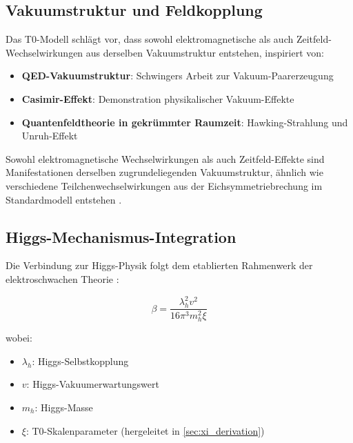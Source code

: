 \documentclass[12pt,a4paper]{article}
\begin{document}
	\subsection{Vakuumstruktur und Feldkopplung}
	\label{subsec:vacuum_structure}
	
	Das T0-Modell schlägt vor, dass sowohl elektromagnetische als auch Zeitfeld-Wechselwirkungen aus derselben Vakuumstruktur entstehen, inspiriert von:
	\begin{itemize}
		\item \textbf{QED-Vakuumstruktur}: Schwingers Arbeit zur Vakuum-Paarerzeugung \citep{schwinger1951}
		\item \textbf{Casimir-Effekt}: Demonstration physikalischer Vakuum-Effekte \citep{casimir1948}
		\item \textbf{Quantenfeldtheorie in gekrümmter Raumzeit}: Hawking-Strahlung \citep{hawking1975} und Unruh-Effekt \citep{unruh1976}
	\end{itemize}
	
	\begin{tcolorbox}[colback=blue!5!white,colframe=blue!75!black,title=Vakuumstruktur-Einheit]
		Sowohl elektromagnetische Wechselwirkungen als auch Zeitfeld-Effekte sind Manifestationen derselben zugrundeliegenden Vakuumstruktur, ähnlich wie verschiedene Teilchenwechselwirkungen aus der Eichsymmetriebrechung im Standardmodell entstehen \citep{weinberg2003,peskin1995}.
	\end{tcolorbox}
	
	\subsection{Higgs-Mechanismus-Integration}
	\label{subsec:higgs_mechanism}
	
	Die Verbindung zur Higgs-Physik folgt dem etablierten Rahmenwerk der elektroschwachen Theorie \citep{higgs1964,englert1964,weinberg1967,salam1968}:
	
	\begin{equation}
		\label{eq:higgs_connection}
		\beta = \frac{\lambda_h^2 v^2}{16\pi^3 m_h^2 \xi}
	\end{equation}
	
	wobei:
	\begin{itemize}
		\item $\lambda_h$: Higgs-Selbstkopplung \citep{djouadi2008}
		\item $v$: Higgs-Vakuumerwartungswert \citep{weinberg2003}
		\item $m_h$: Higgs-Masse \citep{aad2012,chatrchyan2012}
		\item $\xi$: T0-Skalenparameter (hergeleitet in \cref{sec:xi_derivation})
	\end{itemize}
	
\end{document}
